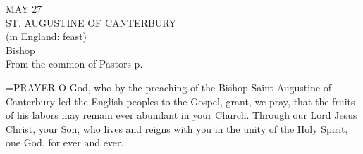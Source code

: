 \begin{center}\normalsize MAY 27\\
\footnotesize ST. AUGUSTINE OF CANTERBURY\\
\footnotesize (in England: feast)\\
\footnotesize Bishop\\
\footnotesize From the common of Pastors p. \\
\end{center}

\hangindent=\parindent \small{PRAYER 
O God, who by the preaching
of the Bishop Saint Augustine of Canterbury
led the English peoples to the Gospel,
grant, we pray, that the fruits of his labors
may remain ever abundant in your Church.
Through our Lord Jesus Christ, your Son,
who lives and reigns with you in the unity of the Holy Spirit,
one God, for ever and ever.\\}
 

